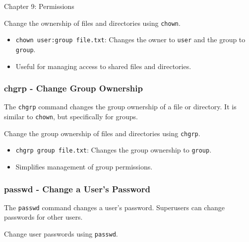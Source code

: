 \begin{notes}{Chapter 9: Permissions}
    \begin{highlight}
    
    Change the ownership of files and directories using \texttt{chown}.
    
    \begin{itemize}
        \item \texttt{chown user:group file.txt}: Changes the owner to \texttt{user} and the group to \texttt{group}.
        \item Useful for managing access to shared files and directories.
    \end{itemize}
    
    \end{highlight}
    
    \subsubsection*{chgrp - Change Group Ownership}
    
    The \texttt{chgrp} command changes the group ownership of a file or directory. It is similar to \texttt{chown}, but specifically for groups.
    
    \begin{highlight}
    
    Change the group ownership of files and directories using \texttt{chgrp}.
    
    \begin{itemize}
        \item \texttt{chgrp group file.txt}: Changes the group ownership to \texttt{group}.
        \item Simplifies management of group permissions.
    \end{itemize}
    
    \end{highlight}
    
    \subsubsection*{passwd - Change a User's Password}
    
    The \texttt{passwd} command changes a user's password. Superusers can change passwords for other users.
    
    \begin{highlight}
    
    Change user passwords using \texttt{passwd}.
    

\end{highlight}
\end{notes}
